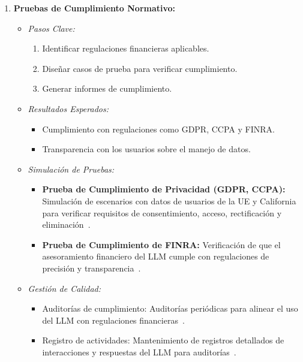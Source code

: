 \documentclass[12pt]{article}
\begin{document}
\begin{enumerate}
    \item \textbf{Pruebas de Cumplimiento Normativo:}
        \begin{itemize}
            \item \textit{Pasos Clave:}
                \begin{enumerate}
                    \item Identificar regulaciones financieras aplicables.
                    \item Diseñar casos de prueba para verificar cumplimiento.
                    \item Generar informes de cumplimiento.
                \end{enumerate}
            \item \textit{Resultados Esperados:}
                \begin{itemize}
                    \item Cumplimiento con regulaciones como GDPR, CCPA y FINRA.
                    \item Transparencia con los usuarios sobre el manejo de datos.
                \end{itemize}
            \item \textit{Simulación de Pruebas:}
                \begin{itemize}
                    \item \textbf{Prueba de Cumplimiento de Privacidad (GDPR, CCPA):} Simulación de escenarios con datos de usuarios de la UE y California para verificar requisitos de consentimiento, acceso, rectificación y eliminación~\cite{lumenova}.
                    \item \textbf{Prueba de Cumplimiento de FINRA:} Verificación de que el asesoramiento financiero del LLM cumple con regulaciones de precisión y transparencia~\cite{lumenova}.
                \end{itemize}
            \item \textit{Gestión de Calidad:}
                \begin{itemize}
                    \item Auditorías de cumplimiento: Auditorías periódicas para alinear el uso del LLM con regulaciones financieras~\cite{lumenova}.
                    \item Registro de actividades: Mantenimiento de registros detallados de interacciones y respuestas del LLM para auditorías~\cite{vstorm}.
                \end{itemize}
        \end{itemize}
\end{enumerate}
\end{document}
